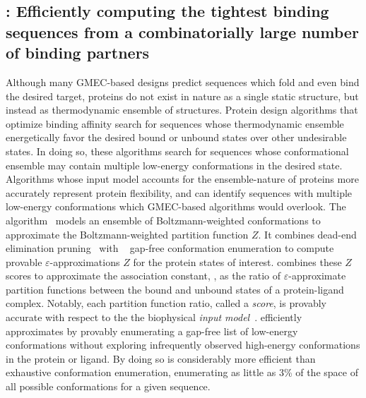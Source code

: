 \def\multisequencebound{MS\xspace}
\def\msbound{\multisequencebound}


\def\submissionMode{0}

\newcommand{\cut}[1]{}

\subsection{\bbks: Efficiently computing the tightest binding sequences from a combinatorially large number of binding partners}
Although many GMEC-based designs predict sequences which fold and even bind the desired target, proteins do not exist in nature as a single static structure, but instead as thermodynamic ensemble of structures. Protein design algorithms that optimize binding affinity search for sequences whose thermodynamic ensemble energetically favor the desired bound or unbound states over other undesirable states. In doing so, these algorithms search for sequences whose conformational ensemble may contain multiple low-energy conformations in the desired state. Algorithms whose input model accounts for the ensemble-nature of proteins more accurately represent protein flexibility, and can identify sequences with multiple low-energy conformations which GMEC-based algorithms would overlook.
The \ks algorithm~\cite{} models an ensemble of Boltzmann-weighted conformations to approximate the Boltzmann-weighted partition function $Z$. It combines dead-end elimination pruning~\cite{} with \as~\cite{} gap-free conformation enumeration to compute provable $\varepsilon$-approximations $Z$ for the protein states of interest. \ks combines these $Z$ scores to approximate the association constant, \ka, as the ratio of $\varepsilon$-approximate partition functions between the bound and unbound states of a protein-ligand complex. Notably, each partition function ratio, called a \ks \emph{score}, is provably accurate with respect to the the biophysical \emph{input model}~\cite{}. \cut{The input model defines the set of allowed amino acid mutations (i.e.~the \emph{sequence space}), structural search space (i.e.~the input structures, and allowed protein flexibility), the optimization objective (e.g.~design for binding affinity), and the energy function~\cite{}.} \ks efficiently approximates \ka by provably enumerating a gap-free list of low-energy conformations without exploring infrequently observed high-energy conformations in the protein or ligand. By doing so \ks is considerably more efficient than exhaustive conformation enumeration, enumerating as little as 3\% of the space of all possible conformations for a given sequence.
